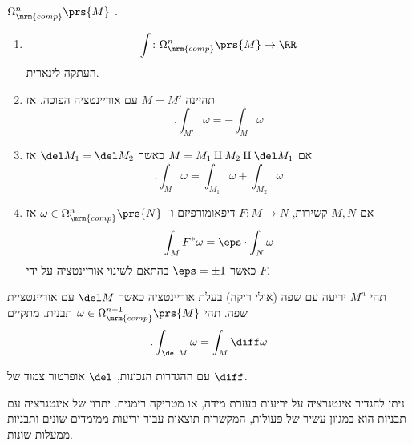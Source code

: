 \documentclass[a4paper,10pt,twoside,openany]{book}
\begin{document}
\begin{definition}
$\Omega^n_{\mrm{comp}}\prs{M}$
.
\end{definition}

\begin{proposition}
\begin{enumerate}
\item \[\int \colon \Omega^n_{\mrm{comp}}\prs{M} \to \RR\]
העתקה לינארית.
\item תהיינה
$M = M'$
עם אוריינטציה הפוכה. אז
\[\text{.} \int_{M'} \omega = -\int_M \omega\]
\item אם
$M = M_1 \amalg M_2 \amalg \del M_1$
כאשר
$\del M_1 = \del M_2$
אז
\[\text{.} \int_M \omega = \int_{M_1} \omega + \int_{M_2} \omega\]
\item אם
$M,N$
קשירות,
$F \colon M \to N$
דיפאומורפיזם ו־%
$\omega \in \Omega_{\mrm{comp}}^n \prs{N}$
אז
\[\int_M F^* \omega = \eps \cdot \int_N \omega\]
כאשר
$\eps = \pm 1$
בהתאם לשינוי אוריינטציה על ידי
$F$.
\end{enumerate}
\end{proposition}

\begin{theorem}
תהי
$M^n$
יריעה עם שפה (אולי ריקה) בעלת אוריינטציה כאשר
$\del M$
עם אוריינטציית שפה.
תהי
$\omega \in \Omega^{n-1}_{\mrm{comp}}\prs{M}$
תבנית. מתקיים
\[\text{.} \int_{\del M} \omega = \int_M \diff \omega\]
\end{theorem}
\begin{remark}
עם ההגדרות הנכונות,
$\del$
אופרטור צמוד של
$\diff$.
\end{remark}
\begin{remark}
ניתן להגדיר אינטגרציה על יריעות בעזרת מידה, או מטריקה רימנית.
יתרון של אינטגרציה עם תבניות הוא במגוון עשיר של פעולות, המקשרות תוצאות עבור יריעות ממימדים שונים ותבניות ממעלות שונות.
\end{remark}
\end{document}
